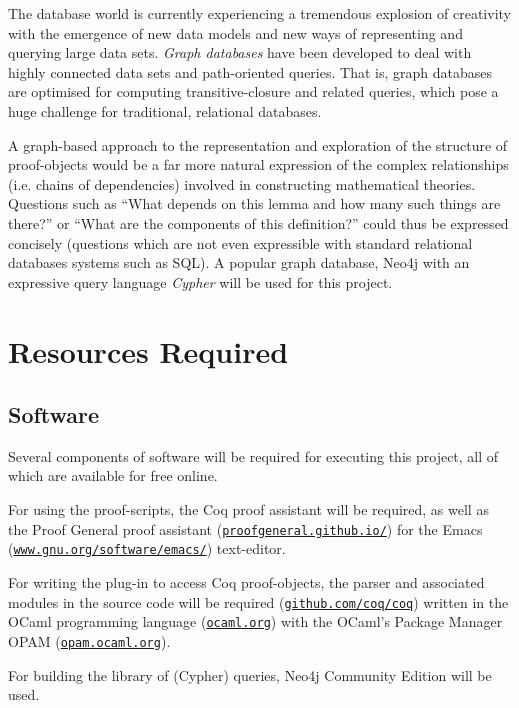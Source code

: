 \documentclass[12pt]{article}
\begin{document}
The database world is currently experiencing a tremendous explosion of creativity
with the emergence of new data models and new ways of representing and querying
large data sets. \emph{Graph databases} have been developed to deal with highly
connected data sets and path-oriented queries. That is, graph databases are
optimised for computing transitive-closure and related queries, which pose a
huge challenge for traditional, relational databases.

A graph-based approach to the representation and exploration of the structure of
proof-objects would	be a far more natural expression of the complex
relationships (i.e. chains of dependencies) involved in
constructing mathematical theories. Questions such as ``What depends on this
lemma and how many such things are there?'' or ``What are the components of
this definition?'' could thus be expressed concisely (questions which are not
even expressible with standard relational databases systems such as
SQL). A popular graph database, Neo4j \cite{neo4j} with an expressive query
language \emph{Cypher} will be used for this project.
	
\section*{Resources Required}

\subsection*{Software}
Several components of software will be required for executing this project, all
of which are available for free online.

For using the proof-scripts, the Coq proof assistant will be required, as well
as the Proof General proof assistant
(\href{http://proofgeneral.github.io/}{\texttt{proofgeneral.github.io/}}) for the Emacs
(\href{http://www.gnu.org/software/emacs/}{\texttt{www.gnu.org/software/emacs/}})
text-editor.

For writing the plug-in to access Coq proof-objects, the parser and associated
modules in the source code will be required
(\href{http://github.com/coq/coq}{\texttt{github.com/coq/coq}}) written in the OCaml
programming language (\href{http://ocaml.org}{\texttt{ocaml.org}}) with the OCaml's
Package Manager OPAM (\href{http://opam.ocaml.org}{\texttt{opam.ocaml.org}}).

For building the library of (Cypher) queries, Neo4j Community Edition will be
used.
\end{document}
